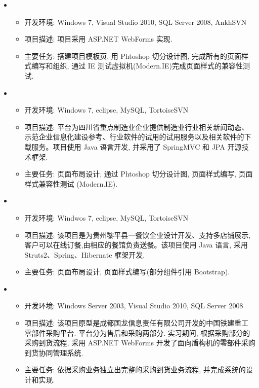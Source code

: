 \documentclass[letterpaper,11pt]{article}
\begin{document}
  \begin{itemize}
    \item
      {\footnotesize
      \begin{itemize}
        \item 开发环境: Windows 7, Visual Studio 2010, SQL Server 2008, AnkhSVN
        \item 项目描述: 项目采用 ASP.NET WebForms 实现.
        \item 主要任务: 搭建项目模板页, 用 Phtoshop 切分设计图, 完成所有的页面样式编写和组织, 通过 IE 测试虚拟机(Modern.IE)完成页面样式的兼容性测试.
      \end{itemize}
      }
    \item
      {\footnotesize
      \begin{itemize}
        \item 开发环境: Windows 7, eclipse, MySQL, TortoiseSVN
        \item 项目描述: 平台为四川省重点制造业企业提供制造业行业相关新闻动态、示范企业信息化建设参考、行业软件的试用的试用服务以及相关软件的下载服务。项目使用 Java 语言开发, 并采用了 SpringMVC 和 JPA 开源技术框架.
        \item 主要任务: 页面布局设计, 通过 Phtoshop 切分设计图, 页面样式编写, 页面样式兼容性测试 (Modern.IE).
      \end{itemize}
      }
    \item
    {\footnotesize
    \begin{itemize}
      \item 开发环境: Windwos 7, eclipse, MySQL, TortoiseSVN
      \item 项目描述: 该项目是为贵州黎平县一餐饮企业设计开发、支持多店铺展示,客户可以在线订餐,由相应的餐馆负责送餐。该项目使用 Java 语言, 采用 Struts2、Spring、Hibernate 框架开发.
      \item 主要任务: 页面布局设计, 页面样式编写(部分组件引用 Bootstrap).
    \end{itemize}
    }
    \item
    {\footnotesize
    \begin{itemize}
      \item 开发环境: Windows Server 2003, Visual Studio 2010, SQL Server 2008
      \item 项目描述: 该项目原型是成都国龙信息责任有限公司开发的中国铁建重工零部件采购平台. 平台分为售后和采购两部分. 实习期间, 根据采购部分的采购到货流程, 采用 ASP.NET WebForms 开发了面向盾构机的零部件采购到货协同管理系统.
      \item 主要任务: 依据采购业务独立出完整的采购到货业务流程, 并完成系统的设计和实现.
    \end{itemize}
    }
  \end{itemize}
\end{document}
